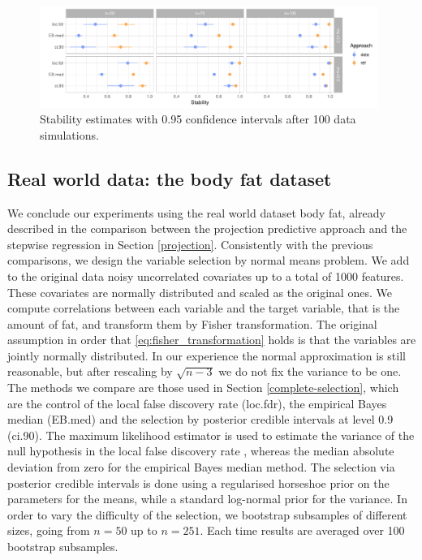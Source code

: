 \documentclass[american,]{article}
\theoremstyle{definition}
\begin{document}
\begin{figure}[tp]
  \centering
  \includegraphics[width=0.98\textwidth]{graphics/stability.pdf}
  \caption{Stability estimates with 0.95 confidence intervals after 100 data simulations.\\}
  \label{fig:stability}
\end{figure}




\hypertarget{real-world-data}{%
\subsection{Real world data: the body fat dataset}\label{real-world-data}}

We conclude our experiments using the real world dataset body fat, already described in the comparison between the projection predictive approach and the stepwise regression in Section \ref{projection}. Consistently with the previous comparisons, we design the variable selection by normal means problem. We add to the original data noisy uncorrelated covariates up to a total of 1000 features. These covariates are normally distributed and scaled as the original ones. We compute correlations between each variable and the target variable, that is the amount of fat, and transform them by Fisher transformation. The original assumption in order that \eqref{eq:fisher_transformation} holds is that the variables are jointly normally distributed. In our experience the normal approximation is still reasonable, but after rescaling by $\sqrt{n-3}$ we do not fix the variance to be one. The methods we compare are those used in Section \ref{complete-selection}, which are the control of the local false discovery rate (loc.fdr), the empirical Bayes median (EB.med) and the selection by posterior credible intervals at level 0.9 (ci.90). The maximum likelihood estimator is used to estimate the variance of the null hypothesis in the local false discovery rate \cite[see][Chap. 6]{book:efron}, whereas the median absolute deviation from zero for the empirical Bayes median method. The selection via posterior credible intervals is done using a regularised horseshoe prior on the parameters for the means, while a standard log-normal  prior for the variance. In order to vary the difficulty of the selection, we bootstrap subsamples of different sizes, going from $n=50$ up to $n=251$. Each time results are averaged over 100 bootstrap subsamples.
\end{document}
